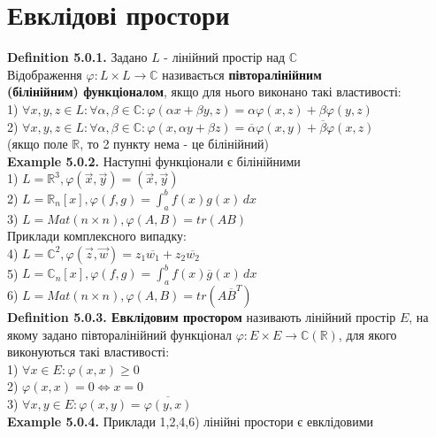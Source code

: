 \documentclass[a4paper, 14pt]{extarticle}
\def\huge{\displaystyle}
\def\defin#1{\textbf{Definition {#1}}}
\def\ex#1{\textbf{Example {#1}}}
\def\bigline{\vspace{5mm}\\}
\begin{document}
\section{Евклідові простори}
\defin{5.0.1.} Задано $L$ - лінійний простір над $\mathbb{C}$\\
Відображення $\varphi : L \times L \to \mathbb{C}$ називається \textbf{півторалінійним} \\ \textbf{(білінійним) функціоналом}, якщо для нього виконано такі властивості:\\
1) $\forall x,y,z \in L: \forall \alpha,\beta \in \mathbb{C}: \varphi (\alpha x + \beta y, z) = \alpha \varphi (x,z) + \beta \varphi (y,z)$\\
2) $\forall x,y,z \in L: \forall \alpha, \beta \in \mathbb{C}: \varphi (x, \alpha y + \beta z) = \overline{\alpha} \varphi (x,y) + \overline{\beta} \varphi (x,z)$\\
(якщо поле $\mathbb{R}$, то 2 пункту нема - це білінійний)
\bigline
\ex{5.0.2.} Наступні функціонали є білінійними\\
1) $L = \mathbb{R}^3, \varphi(\vec{x},\vec{y}) = (\vec{x},\vec{y})$\\
2) $L = \mathbb{R}_n[x], \varphi(f,g) = \huge \int_a^b f(x)g(x)\,dx$\\
3) $L = Mat(n \times n), \varphi(A,B) = tr(AB)$\\
Приклади комплексного випадку:\\
4) $L = \mathbb{C}^2, \varphi(\vec{z},\vec{w}) = z_1 \overline{w_1} + z_2 \overline{w_2}$\\
5) $L = \mathbb{C}_n[x], \varphi(f,g) = \huge \int_a^b f(x) \overline{g}(x)\,dx$\\
6) $L = Mat(n \times n), \varphi(A,B) = tr(A \overline{B}^T)$
\bigline
\defin{5.0.3. Евклідовим простором} називають лінійний простір $E$, на якому задано півторалінійний функціонал $\varphi: E \times E \to \mathbb{C} (\mathbb{R})$, для якого виконуються такі властивості:\\
1) $\forall x \in E: \varphi(x,x) \geq 0$\\
2) $\varphi(x,x) = 0 \iff x = 0$\\
3) $\forall x,y \in E: \varphi(x,y) = \overline{\varphi(y,x)}$
\bigline
\ex{5.0.4.} Приклади 1,2,4,6) лінійні простори є евклідовими
\bigline
\end{document}

